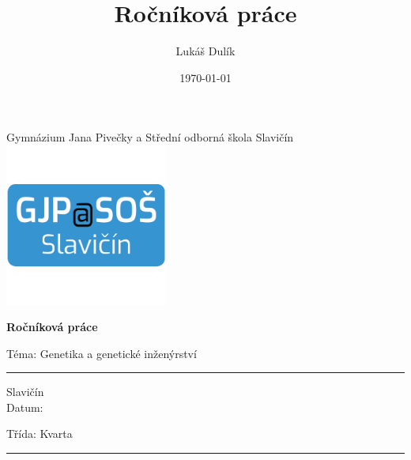 \documentclass[a4paper,12pt,oneside]{book}
\title{Ročníková práce}
\author{Lukáš Dulík}
\date{\today} %
\begin{document}

\begin{titlepage}
    \begin{center}
        \vspace*{1cm}

        \Huge
		Gymnázium Jana Pivečky a Střední odborná škola Slavičín \\

		\includegraphics[width=0.4\textwidth]{gjp.png}

        \textbf{Ročníková práce}

        \vspace{0.5cm}
        \LARGE
        Téma: Genetika a genetické inženýrství
    \end{center}

	\vspace{1.5cm}

	\vfill

	\vspace{0.8cm}

	\vspace{5pt}
	\hrule
	\vspace{6pt}

	\Large

	\makeatletter
	\begin{multicols}{2}
		\noindent
		Slavičín \\
		Datum: \@date

	\columnbreak
		\noindent
		\null\hfill Třída: Kvarta \\
		\null\hfill \@author
	\end{multicols}

	\makeatother

	\vspace{5pt}

	\hrule

\end{titlepage}
\end{document}
